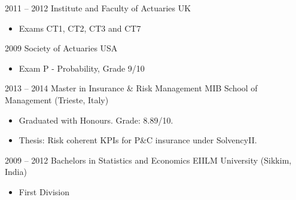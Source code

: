 \documentclass[a4paper,]{fortysecondscv}
\begin{document}
		\begin{cvtable}[2]
			\cvitem
				{2011 -- 2012}
				{Institute and Faculty of Actuaries}
				{UK}
				{
					\vspace{-\topsep}
					\begin{itemize}[nosep, leftmargin=0pt, label={}]
						\item Exams CT1, CT2, CT3 and CT7
					\end{itemize}
				}
			\cvitem
				{2009}
				{Society of Actuaries}
				{USA}
				{
					\vspace{-\topsep}
					\begin{itemize}[nosep, leftmargin=0pt, label={}]
						\item Exam P - Probability, Grade 9/10
					\end{itemize}
				}
		\end{cvtable}


\newpage
\makebacksidebar

	\cvsubsection{Formal}
		\begin{cvtable}[2]
			\cvitem
				{2013 -- 2014}
				{Master in Insurance \& Risk Management}
				{MIB School of Management (Trieste, Italy)}
				{	
					\begin{itemize}[nosep, leftmargin=0pt, label={}] %
						\item Graduated with Honours. Grade: 8.89/10.
						\item Thesis: Risk coherent KPIs for P\&C insurance under SolvencyII.
					\end{itemize}
				}
			\cvitem
				{2009 -- 2012}
				{Bachelors in Statistics and Economics}
				{EIILM University (Sikkim, India)}
				{
					\vspace{-\topsep}
					\begin{itemize}[nosep, leftmargin=0pt, label={}]
						\item First Division
					\end{itemize}
				}
		\end{cvtable}
\end{document}
